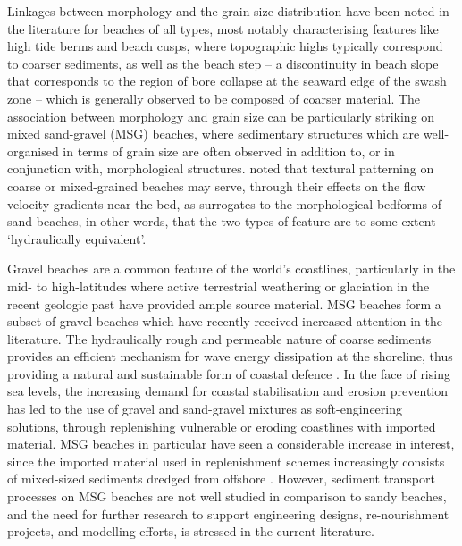 Linkages between morphology and the grain size distribution have been noted in the literature for beaches of all types, most notably characterising features like high tide berms and beach cusps, where topographic highs typically correspond to coarser sediments, as well as the beach step -- a discontinuity in beach slope that corresponds to the region of bore collapse at the seaward edge of the swash zone -- which is generally observed to be composed of coarser material. The association between morphology and grain size can be particularly striking on mixed sand-gravel (MSG) beaches, where sedimentary structures which are well-organised in terms of grain size are often observed in addition to, or in conjunction with, morphological structures. \citet{Buscombe_Masselink2006} noted that textural patterning on coarse or mixed-grained beaches may serve, through their effects on the flow velocity gradients near the bed, as surrogates to the morphological bedforms of sand beaches, in other words, that the two types of feature are to some extent `hydraulically equivalent'.


Gravel beaches are a common feature of the world's coastlines, particularly in the mid- to high-latitudes where active terrestrial weathering or glaciation in the recent geologic past have provided ample source material. MSG beaches form a subset of gravel beaches \citep[see][]{Jennings_Shulmeister2002} which have recently received increased attention in the literature. The hydraulically rough and permeable nature of coarse sediments provides an efficient mechanism for wave energy dissipation at the shoreline, thus providing a natural and sustainable form of coastal defence \citep{VanWellen_etal2000, Almeida_etal2014}. In the face of rising sea levels, the increasing demand for coastal stabilisation and erosion prevention has led to the use of gravel and sand-gravel mixtures as soft-engineering solutions, through replenishing vulnerable or eroding coastlines with imported material. MSG beaches in particular have seen a considerable increase in interest, since the imported material used in replenishment schemes increasingly consists of mixed-sized sediments dredged from offshore \citep{Mason_Coates2001}. However, sediment transport processes on MSG beaches are not well studied in comparison to sandy beaches, and the need for further research to support engineering designs, re-nourishment projects, and modelling efforts, is stressed in the current literature. %

